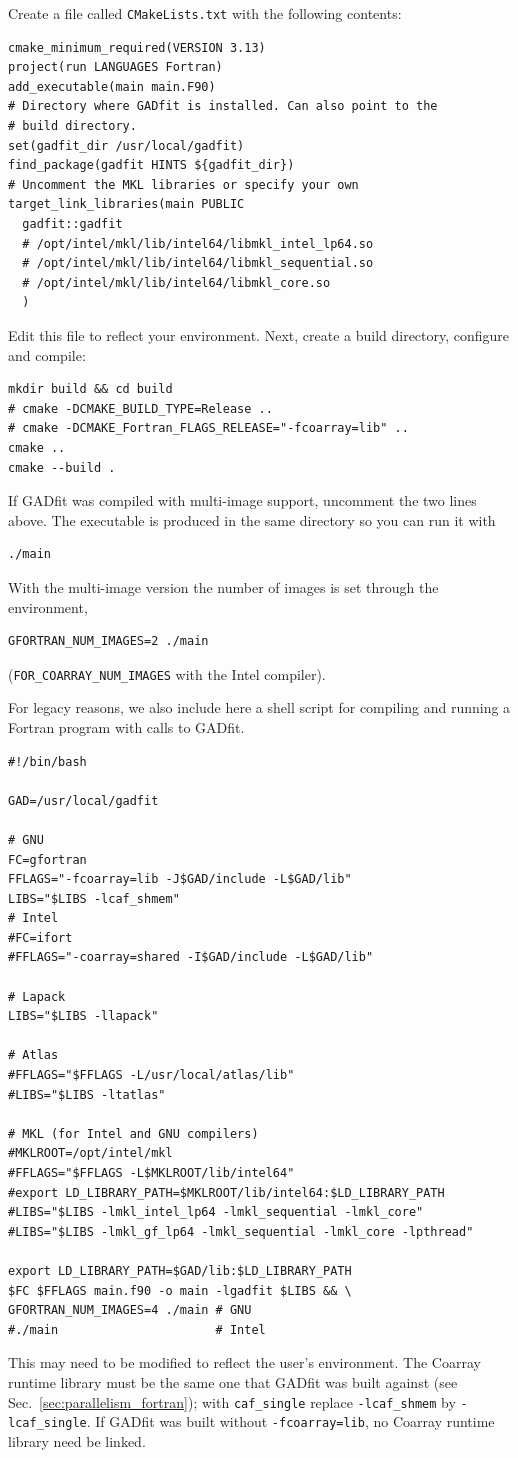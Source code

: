 \documentclass{article}
\begin{document}
Create a file called \verb+CMakeLists.txt+ with the following contents:
\begin{verbatim}
cmake_minimum_required(VERSION 3.13)
project(run LANGUAGES Fortran)
add_executable(main main.F90)
# Directory where GADfit is installed. Can also point to the
# build directory.
set(gadfit_dir /usr/local/gadfit)
find_package(gadfit HINTS ${gadfit_dir})
# Uncomment the MKL libraries or specify your own
target_link_libraries(main PUBLIC
  gadfit::gadfit
  # /opt/intel/mkl/lib/intel64/libmkl_intel_lp64.so
  # /opt/intel/mkl/lib/intel64/libmkl_sequential.so
  # /opt/intel/mkl/lib/intel64/libmkl_core.so
  )
\end{verbatim}
Edit this file to reflect your environment. Next, create a build directory, configure and compile:
\begin{verbatim}
mkdir build && cd build
# cmake -DCMAKE_BUILD_TYPE=Release ..
# cmake -DCMAKE_Fortran_FLAGS_RELEASE="-fcoarray=lib" ..
cmake ..
cmake --build .
\end{verbatim}
If GADfit was compiled with multi-image support, uncomment the two lines above. The executable is produced in the same directory so you can run it with
\begin{verbatim}
./main
\end{verbatim}
With the multi-image version the number of images is set through the environment,
\begin{verbatim}
GFORTRAN_NUM_IMAGES=2 ./main
\end{verbatim}
(\verb+FOR_COARRAY_NUM_IMAGES+ with the Intel compiler).

For legacy reasons, we also include here a shell script for compiling and running a Fortran program with calls to GADfit.
\begin{verbatim}
#!/bin/bash

GAD=/usr/local/gadfit

# GNU
FC=gfortran
FFLAGS="-fcoarray=lib -J$GAD/include -L$GAD/lib"
LIBS="$LIBS -lcaf_shmem"
# Intel
#FC=ifort
#FFLAGS="-coarray=shared -I$GAD/include -L$GAD/lib"

# Lapack
LIBS="$LIBS -llapack"

# Atlas
#FFLAGS="$FFLAGS -L/usr/local/atlas/lib"
#LIBS="$LIBS -ltatlas"

# MKL (for Intel and GNU compilers)
#MKLROOT=/opt/intel/mkl
#FFLAGS="$FFLAGS -L$MKLROOT/lib/intel64"
#export LD_LIBRARY_PATH=$MKLROOT/lib/intel64:$LD_LIBRARY_PATH
#LIBS="$LIBS -lmkl_intel_lp64 -lmkl_sequential -lmkl_core"
#LIBS="$LIBS -lmkl_gf_lp64 -lmkl_sequential -lmkl_core -lpthread"

export LD_LIBRARY_PATH=$GAD/lib:$LD_LIBRARY_PATH
$FC $FFLAGS main.f90 -o main -lgadfit $LIBS && \
GFORTRAN_NUM_IMAGES=4 ./main # GNU
#./main                      # Intel
\end{verbatim}
This may need to be modified to reflect the user's environment. The Coarray runtime library must be the same one that GADfit was built against (see Sec.~\ref{sec:parallelism_fortran}); with \verb+caf_single+ replace \verb+-lcaf_shmem+ by \verb+-lcaf_single+. If GADfit was built without \verb+-fcoarray=lib+, no Coarray runtime library need be linked.
\end{document}
